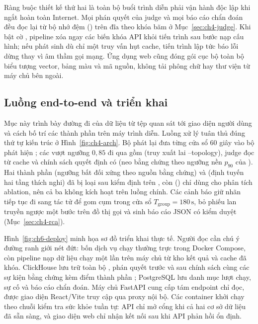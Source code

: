 Ràng buộc thiết kế thứ hai là toàn bộ buổi trình diễn phải vận hành độc lập khi ngắt hoàn toàn Internet. Mọi phán quyết của judge  và mọi báo cáo chẩn đoán đều đọc lại từ bộ nhớ đệm () trên đĩa theo khóa băm ở Mục~\ref{sec:ch4-judge}. Khi bật cờ , pipeline xóa ngay các biến khóa API khỏi tiến trình sau bước nạp cấu hình; nếu phát sinh dù chỉ một truy vấn hụt cache, tiến trình lập tức báo lỗi dừng thay vì âm thầm gọi mạng. Ứng dụng web cũng đóng gói cục bộ toàn bộ biểu tượng vector, bảng màu và mã nguồn, không tải phông chữ hay thư viện từ máy chủ bên ngoài.

\subsection{Luồng end-to-end và triển khai}
\label{sec:ch6-luong}

Mục này trình bày đường đi của dữ liệu từ tệp quan sát tới giao diện người dùng và cách bố trí các thành phần trên máy trình diễn. Luồng xử lý tuân thủ đúng thứ tự kiến trúc ở Hình~\ref{fig:ch4-arch}. Bộ phát lại đưa từng cửa sổ  60 giây vào bộ phát hiện ; các  vượt ngưỡng $0{,}85$ đi qua \CTAV{} gồm  (truy xuất lai --topology), judge  đọc từ cache và chính sách quyết định có  (neo bằng chứng theo ngưỡng nền $p_{90}$ của ). Hai thành phần  (ngưỡng bất đối xứng theo nguồn bằng chứng) và  (định tuyến hai tầng thích nghi) đã bị loại sau kiểm định trên , còn  () chỉ dùng cho phân tích ablation, nên cả ba không kích hoạt trên luồng chính. Các cảnh báo giữ nhãn  tiếp tục đi sang tác tử  để gom cụm trong cửa sổ $T_{\text{group}} = 180\,\text{s}$, bỏ phiếu lan truyền ngược một bước trên đồ thị gọi và sinh báo cáo JSON có kiểm duyệt (Mục~\ref{sec:ch4-rca}).

Hình~\ref{fig:ch6-deploy} minh họa sơ đồ triển khai thực tế. Người đọc cần chú ý đường ranh giới nét đứt: bốn dịch vụ chạy thường trực trong Docker Compose, còn pipeline nạp dữ liệu chạy một lần trên máy chủ từ kho kết quả và cache đã khóa. ClickHouse lưu trữ toàn bộ , phán quyết trước và sau chính sách cùng các sự kiện bằng chứng kèm điểm thành phần ; PostgreSQL lưu danh mục lượt chạy, sự cố và báo cáo chẩn đoán. Máy chủ FastAPI cung cấp tám endpoint chỉ đọc, được giao diện React/Vite truy cập qua proxy nội bộ. Các container khởi chạy theo chuỗi kiểm tra sức khỏe tuần tự: API chỉ mở cổng khi cả hai cơ sở dữ liệu đã sẵn sàng, và giao diện web chỉ nhận kết nối sau khi API phản hồi ổn định.

